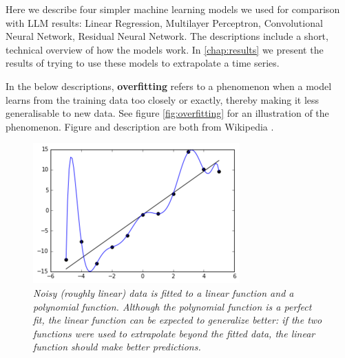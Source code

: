 Here we describe four simpler machine learning models we used for comparison with LLM results: Linear Regression, Multilayer Perceptron, Convolutional Neural Network, Residual Neural Network. The descriptions include a short, technical overview of how the models work. In \autoref{chap:results} we present the results of trying to use these models to extrapolate a time series.

In the below descriptions, \textbf{overfitting} refers to a phenomenon when a model learns from the training data too closely or exactly, thereby making it less generalisable to new data. See  figure  \autoref{fig:overfitting} for an illustration of the phenomenon. Figure and description are both from Wikipedia \cite{overfitting}.
\begin{figure}[h!]
	\centering
	\includegraphics[width=0.5\linewidth]{"pictures/overfitted_data.png"}
	\caption{\textit{Noisy (roughly linear) data is fitted to a linear function and a polynomial function. Although the polynomial function is a perfect fit, the linear function can be expected to generalize better: if the two functions were used to extrapolate beyond the fitted data, the linear function should make better predictions.}}
	\label{fig:overfitting}
\end{figure}
